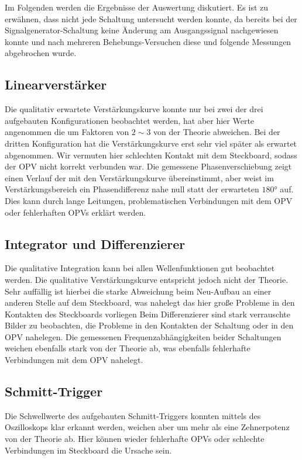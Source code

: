 Im Folgenden werden die Ergebnisse der Auswertung diskutiert. Es ist zu erwähnen, dass nicht jede Schaltung untersucht werden konnte, da bereits bei der Signalgenerator-Schaltung keine Änderung am Ausgangssignal nachgewiesen konnte und nach mehreren Behebungs-Versuchen diese und folgende Messungen abgebrochen wurde.

\subsection{Linearverstärker}
Die qualitativ erwartete Verstärkungskurve konnte nur bei zwei der drei aufgebauten Konfigurationen beobachtet werden, hat aber hier Werte angenommen die um Faktoren von $2\sim 3$ von der Theorie abweichen. Bei der dritten Konfiguration hat die Verstärkungskurve erst sehr viel später als erwartet abgenommen. Wir vermuten hier schlechten Kontakt mit dem Steckboard, sodass der OPV nicht korrekt verbunden war.
Die gemessene Phasenverschiebung zeigt einen Verlauf der mit den Verstärkungskurve übereinstimmt, aber weist im Verstärkungsbereich ein Phasendifferenz nahe null statt der erwarteten $180$° auf. Dies kann durch lange Leitungen, problematischen Verbindungen mit dem OPV oder fehlerhaften OPVs erklärt werden.

\subsection{Integrator und Differenzierer}
Die qualitative Integration kann bei allen Wellenfunktionen gut beobachtet werden. Die qualitative Verstärkungskurve entspricht jedoch nicht der Theorie. Sehr auffällig ist hierbei die starke Abweichung beim Neu-Aufbau an einer anderen Stelle auf dem Steckboard, was nahelegt das hier große Probleme in den Kontakten des Steckboards vorliegen
Beim Differenzierer sind stark verrauschte Bilder zu beobachten, die Probleme in den Kontakten der Schaltung oder in den OPV nahelegen. Die gemessenen Frequenzabhängigkeiten beider Schaltungen weichen ebenfalls stark von der Theorie ab, was ebenfalls fehlerhafte Verbindungen mit dem OPV nahelegt.

\subsection{Schmitt-Trigger}
Die Schwellwerte des aufgebauten Schmitt-Triggers konnten mittels des Oszilloskops klar erkannt werden, weichen aber um mehr als eine Zehnerpotenz von der Theorie ab. Hier können wieder fehlerhafte OPVs oder schlechte Verbindungen im Steckboard die Ursache sein.

